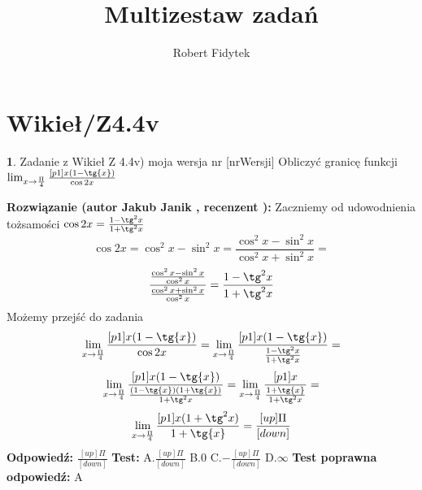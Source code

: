 \documentclass[12pt, a4paper]{article}
\title{Multizestaw zadań}
\author{Robert Fidytek}
\date{}
\theoremstyle{definition} %
\newtheorem{zad}{}
\newcommand{\kategoria}[1]{\section{#1}} %
\newcommand{\zadStart}[1]{\begin{zad}#1\newline} %
\newcommand{\zadStop}{\end{zad}}   %
\newcommand{\rozwStart}[2]{\noindent \textbf{Rozwiązanie (autor #1 , recenzent #2): }\newline} %
\newcommand{\rozwStop}{\newline}                                            %
\newcommand{\odpStart}{\noindent \textbf{Odpowiedź:}\newline}    %
\newcommand{\odpStop}{\newline}                                             %
\newcommand{\testStart}{\noindent \textbf{Test:}\newline} %
\newcommand{\testStop}{\newline} %
\newcommand{\kluczStart}{\noindent \textbf{Test poprawna odpowiedź:}\newline} %
\newcommand{\kluczStop}{\newline} %
\begin{document}
\maketitle


\kategoria{Wikieł/Z4.4v}
\zadStart{Zadanie z Wikieł Z 4.4v) moja wersja nr [nrWersji]}
Obliczyć granicę funkcji $\lim_{x \to \frac{\Pi}{4}} \frac{[p1]x(1-\tg{x})}{\cos{2x}}$
\zadStop
\rozwStart{Jakub Janik}{}
Zaczniemy od udowodnienia tożsamości $\cos{2x}=\frac{1-\tg^2{x}}{1+\tg^2{x}}$
$$\cos{2x}=\cos^2{x}-\sin^2{x}=\frac{\cos^2{x}-\sin^2{x}}{\cos^2{x}+\sin^2{x}}=$$
$$\frac{\frac{\cos^2{x}-\sin^2{x}}{\cos^2{x}}}{\frac{\cos^2{x}+\sin^2{x}}{\cos^2{x}}}=\frac{1-\tg^2{x}}{1+\tg^2{x}}$$
Możemy przejść do zadania
$$\lim_{x \to \frac{\Pi}{4}} \frac{[p1]x(1-\tg{x})}{\cos{2x}}=\lim_{x \to \frac{\Pi}{4}} \frac{[p1]x(1-\tg{x})}{\frac{1-\tg^2{x}}{1+\tg^2{x}}}=$$
$$\lim_{x \to \frac{\Pi}{4}} \frac{[p1]x(1-\tg{x})}{\frac{(1-\tg{x})(1+\tg{x})}{1+\tg^2{x}}}=\lim_{x \to \frac{\Pi}{4}} \frac{[p1]x}{\frac{1+\tg{x}}{1+\tg^2{x}}}=$$
$$\lim_{x \to \frac{\Pi}{4}} \frac{[p1]x(1+\tg^2{x})}{1+\tg{x}}=\frac{[up]\Pi}{[down]}$$
\rozwStop
\odpStart
$\frac{[up]\Pi}{[down]}$
\odpStop
\testStart
A.$\frac{[up]\Pi}{[down]}$
B.$0$
C.$-\frac{[up]\Pi}{[down]}$
D.$\infty$
\testStop
\kluczStart
A
\kluczStop
\end{document}
